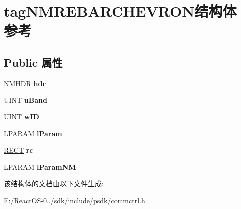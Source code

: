 \hypertarget{structtag_n_m_r_e_b_a_r_c_h_e_v_r_o_n}{}\section{tag\+N\+M\+R\+E\+B\+A\+R\+C\+H\+E\+V\+R\+O\+N结构体 参考}
\label{structtag_n_m_r_e_b_a_r_c_h_e_v_r_o_n}
\subsection*{Public 属性}
\begin{DoxyCompactItemize}
\item 
\mbox{\label{structtag_n_m_r_e_b_a_r_c_h_e_v_r_o_n_a092aeeb26552f87b84154e06928a3942}} 
\hyperlink{structtag_n_m_h_d_r}{N\+M\+H\+DR} {\bfseries hdr}
\item 
\mbox{\label{structtag_n_m_r_e_b_a_r_c_h_e_v_r_o_n_a9c8d90c8a66a366687cdbc53c6ce826d}} 
U\+I\+NT {\bfseries u\+Band}
\item 
\mbox{\label{structtag_n_m_r_e_b_a_r_c_h_e_v_r_o_n_ad08425ac8cbbcf0753054ea628975857}} 
U\+I\+NT {\bfseries w\+ID}
\item 
\mbox{\label{structtag_n_m_r_e_b_a_r_c_h_e_v_r_o_n_aa7af423c51e79b43ca7ae5d3fada5829}} 
L\+P\+A\+R\+AM {\bfseries l\+Param}
\item 
\mbox{\label{structtag_n_m_r_e_b_a_r_c_h_e_v_r_o_n_af66151f4e189c76b52956c9d36b84e47}} 
\hyperlink{structtag_r_e_c_t}{R\+E\+CT} {\bfseries rc}
\item 
\mbox{\label{structtag_n_m_r_e_b_a_r_c_h_e_v_r_o_n_ad23577c47b230a83df87a21ea46d4402}} 
L\+P\+A\+R\+AM {\bfseries l\+Param\+NM}
\end{DoxyCompactItemize}


该结构体的文档由以下文件生成\+:\begin{DoxyCompactItemize}
\item 
E\+:/\+React\+O\+S-\/0../sdk/include/psdk/commctrl.\+h\end{DoxyCompactItemize}
